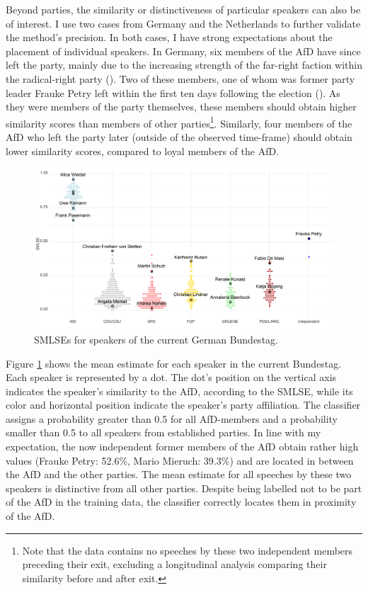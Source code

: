 \documentclass{article}
\begin{document}
Beyond parties, the similarity or distinctiveness of particular speakers can also be of interest. I use two cases from Germany and the Netherlands to further validate the method's precision. In both cases, I have strong expectations about the placement of individual speakers. In Germany, six members of the AfD have since left the party, mainly due to the increasing strength of the far-right faction within the radical-right party (\cite{Steffen2020AfD}). Two of these members, one of whom was former party leader Frauke Petry left within the first ten days following the election (\cite{LSE2018AfD}). As they were members of the party themselves, these members should obtain higher similarity scores than members of other parties\footnote{Note that the data contains no speeches by these two independent members preceding their exit, excluding a longitudinal analysis comparing their similarity before and after exit.}. Similarly, four members of the AfD who left the party later (outside of the observed time-frame) should obtain lower similarity scores, compared to loyal members of the AfD. \par

\begin{figure}
    \centering
    \includegraphics[width=19cm]{DE/vis/DE_speakers.png}
    \caption{SMLSEs for speakers of the current German Bundestag.}
    \label{fig:speakers}
\end{figure}

Figure \ref{fig:speakers} shows the mean estimate for each speaker in the current Bundestag. Each speaker is represented by a dot. The dot's position on the vertical axis indicates the speaker's similarity to the AfD, according to the SMLSE, while its color and horizontal position indicate the speaker's party affiliation. The classifier assigns a probability greater than 0.5 for all AfD-members and a probability smaller than 0.5 to all speakers from established parties. In line with my expectation, the now independent former members of the AfD obtain rather high values (Frauke Petry: 52.6\%, Mario Mieruch: 39.3\%) and are located in between the AfD and the other parties. The mean estimate for all speeches by these two speakers is distinctive from all other parties. Despite being labelled not to be part of the AfD in the training data, the classifier correctly locates them in proximity of the AfD. \par
\end{document}
